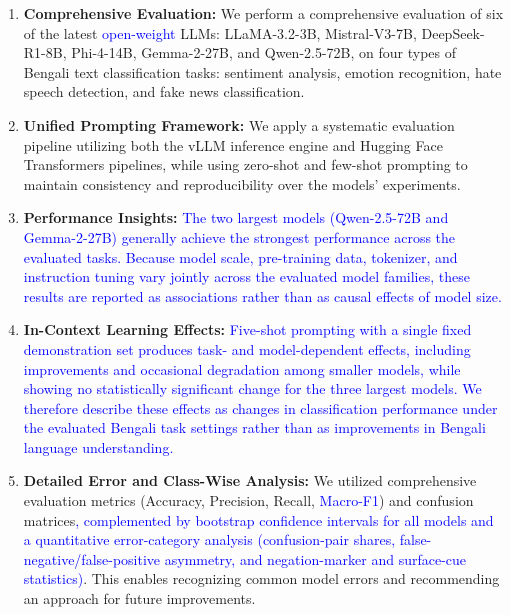 \documentclass[10pt,letterpaper]{article}
\newcommand{\rev}[1]{\textcolor{blue}{#1}}
\begin{document}
\begin{enumerate}
    \item \textbf{Comprehensive Evaluation:} We perform a comprehensive evaluation of six of the latest \rev{open-weight} LLMs: LLaMA-3.2-3B, Mistral-V3-7B, DeepSeek-R1-8B, Phi-4-14B, Gemma-2-27B, and Qwen-2.5-72B, on four types of Bengali text classification tasks: sentiment analysis, emotion recognition, hate speech detection, and fake news classification.
    
    \item \textbf{Unified Prompting Framework:} We apply a systematic evaluation pipeline utilizing both the vLLM inference engine and Hugging Face Transformers pipelines, while using zero-shot and few-shot prompting to maintain consistency and reproducibility over the models' experiments.
    
    
    \item \textbf{Performance Insights:} \rev{The two largest models (Qwen-2.5-72B and Gemma-2-27B) generally achieve the strongest performance across the evaluated tasks. Because model scale, pre-training data, tokenizer, and instruction tuning vary jointly across the evaluated model families, these results are reported as associations rather than as causal effects of model size.}
    
    \item \textbf{In-Context Learning Effects:} \rev{Five-shot prompting with a single fixed demonstration set produces task- and model-dependent effects, including improvements and occasional degradation among smaller models, while showing no statistically significant change for the three largest models. We therefore describe these effects as changes in classification performance under the evaluated Bengali task settings rather than as improvements in Bengali language understanding.}
    
    \item \textbf{Detailed Error and Class-Wise Analysis:} We utilized comprehensive evaluation metrics (Accuracy, Precision, Recall, \rev{Macro-F1}) and confusion matrices\rev{, complemented by bootstrap confidence intervals for all models and a quantitative error-category analysis (confusion-pair shares, false-negative/false-positive asymmetry, and negation-marker and surface-cue statistics)}. This enables recognizing common model errors and recommending an approach for future improvements.

\end{enumerate}
\end{document}
